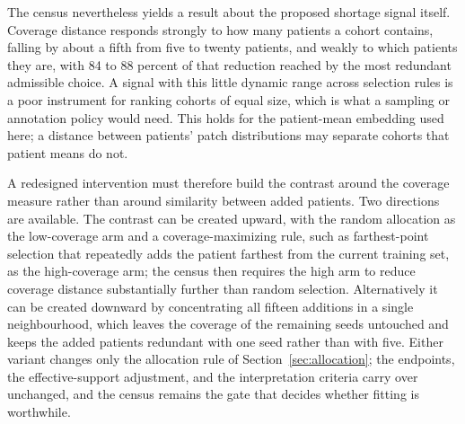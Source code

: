 The census nevertheless yields a result about the proposed shortage signal itself. Coverage distance responds strongly to how many patients a cohort contains, falling by about a fifth from five to twenty patients, and weakly to which patients they are, with 84 to 88 percent of that reduction reached by the most redundant admissible choice. A signal with this little dynamic range across selection rules is a poor instrument for ranking cohorts of equal size, which is what a sampling or annotation policy would need. This holds for the patient-mean embedding used here; a distance between patients' patch distributions may separate cohorts that patient means do not.

A redesigned intervention must therefore build the contrast around the coverage measure rather than around similarity between added patients. Two directions are available. The contrast can be created upward, with the random allocation as the low-coverage arm and a coverage-maximizing rule, such as farthest-point selection that repeatedly adds the patient farthest from the current training set, as the high-coverage arm; the census then requires the high arm to reduce coverage distance substantially further than random selection. Alternatively it can be created downward by concentrating all fifteen additions in a single neighbourhood, which leaves the coverage of the remaining seeds untouched and keeps the added patients redundant with one seed rather than with five. Either variant changes only the allocation rule of Section~\ref{sec:allocation}; the endpoints, the effective-support adjustment, and the interpretation criteria carry over unchanged, and the census remains the gate that decides whether fitting is worthwhile.

